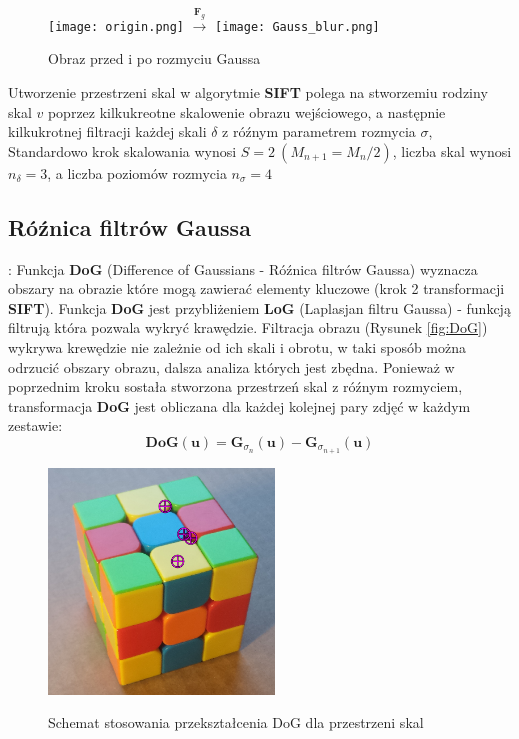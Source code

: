    \begin{figure}[h]
      \centering
      \texttt{[image: origin.png]}
      \Large{$ \xrightarrow{\mathbf{F}_{g}} $}
      \texttt{[image: Gauss\_blur.png]}
      \caption{Obraz przed i po rozmyciu Gaussa}
      \label {fig:gauss_blur}
   \end{figure}

   Utworzenie przestrzeni skal w algorytmie \textbf{SIFT} polega na stworzemiu rodziny skal $v$ poprzez kilkukreotne skalowenie obrazu wejściowego, a następnie kilkukrotnej filtracji każdej skali $\delta$ z róźnym parametrem rozmycia $\sigma$,
   Standardowo krok skalowania wynosi $ S = 2 \: (M_{n+1} = M_{n} / 2)$, liczba skal wynosi $ n_{\delta} = 3$, a liczba poziomów rozmycia $ n_{\sigma} = 4$

\subsection{Róźnica filtrów Gaussa}:
   Funkcja \textbf{DoG} (Difference of Gaussians - Róźnica filtrów Gaussa) wyznacza obszary na obrazie które mogą zawierać elementy kluczowe (krok 2 transformacji \textbf{SIFT}). Funkcja \textbf{DoG} jest przybliżeniem \textbf{LoG} (Laplasjan filtru Gaussa) - funkcją filtrują która pozwala wykryć krawędzie. Filtracja obrazu (Rysunek \ref{fig:DoG})  wykrywa krewędzie nie zależnie od ich skali i obrotu, w taki sposób można odrzucić obszary obrazu, dalsza analiza których jest zbędna. Ponieważ w poprzednim kroku sostała stworzona przestrzeń skal z róźnym rozmyciem, transformacja \textbf{DoG} jest obliczana dla każdej kolejnej pary zdjęć w każdym zestawie:
   \begin{equation} \label{eq:DoG}
      \mathbf{DoG}(\mathbf{u}) = \mathbf{G}_{\sigma_n}(\mathbf{u}) - \mathbf{G}_{\sigma_{n+1}}(\mathbf{u})
   \end{equation}

   \begin{figure}[h]
      \centering
      \includegraphics[width=6cm]{SIFT_cube_points.png}
      \label {fig:G2DoG.png}
      \caption{Schemat stosowania przekształcenia DoG dla przestrzeni skal}
      \label {fig:DoGT}
   \end{figure}

